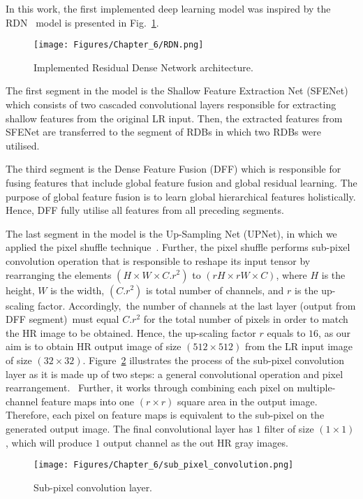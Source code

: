In this work, the first implemented deep learning model was inspired by the RDN~\cite{Zhang2018} model is presented in Fig.~\ref{fig:RDN}.
\begin{figure} [h!]
	\begin{center}
		\texttt{[image: Figures/Chapter\_6/RDN.png]}
	\end{center}
	\caption{Implemented Residual Dense Network architecture.} 
	\label{fig:RDN}
\end{figure}
The first segment in the model is the Shallow Feature Extraction Net (SFENet) which consists of two cascaded convolutional layers responsible for extracting shallow features from the original LR input.
Then, the extracted features from SFENet are transferred to the segment of RDBs in which two RDBs were utilised.

The third segment is the Dense Feature Fusion (DFF) which is responsible for fusing features that include global feature fusion and global residual learning.
The purpose of global feature fusion is to learn global hierarchical features holistically.
Hence, DFF fully utilise all features from all preceding segments.

The last segment in the model is the Up-Sampling Net (UPNet), in which we applied the pixel shuffle technique~\cite{Shi2016}.
Further, the pixel shuffle performs sub-pixel convolution operation that is responsible to reshape its input tensor by rearranging the elements \((H\times W\times C.r^2)\) to \((rH\times rW\times C)\), where \(H\) is the height, \(W\) is the width, \((C.r^2)\) is total number of channels, and \(r\) is the up-scaling factor.
Accordingly, the number of channels at the last layer (output from DFF segment) must equal \(C.r^2\) for the total number of pixels in order to match the HR image to be obtained.
Hence, the up-scaling factor \(r\) equals to \(16\), as our aim is to obtain HR output image of size \((512\times 512)\) from the LR input image of size \((32\times 32)\).
Figure~\ref{fig:sub_pixel_layer} illustrates the process of the sub-pixel convolution layer as it is made up of two steps: a general convolutional operation and pixel rearrangement. 
Further, it works through combining each pixel on multiple-channel feature maps into one \((r\times r)\) square area in the output image. 
Therefore, each pixel on feature maps is equivalent to the sub-pixel on the generated output image.
The final convolutional layer has \(1\) filter of size \((1\times 1)\), which will produce \(1\) output channel as the out HR gray images. 
\begin{figure} [h!]
	\begin{center}
		\texttt{[image: Figures/Chapter\_6/sub\_pixel\_convolution.png]}
	\end{center}
	\caption{Sub-pixel convolution layer.} 
	\label{fig:sub_pixel_layer}
\end{figure}

